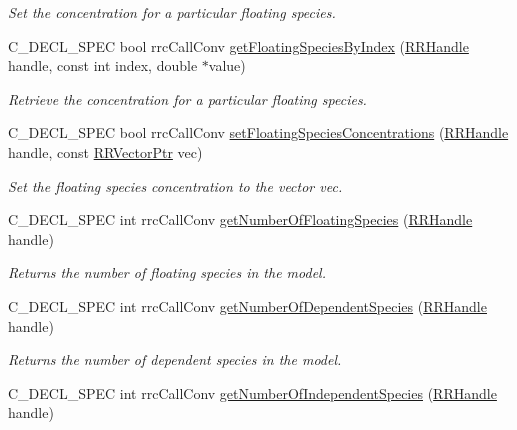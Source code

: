 \begin{DoxyCompactItemize}
\begin{DoxyCompactList}\small\item\em Set the concentration for a particular floating species. \end{DoxyCompactList}\item 
C\-\_\-\-D\-E\-C\-L\-\_\-\-S\-P\-E\-C bool rrc\-Call\-Conv \hyperlink{group__floating_gaa5ab4c688801aa88c60bea9c745a8d7d}{get\-Floating\-Species\-By\-Index} (\hyperlink{rrc__types_8h_a1d68f0592372208fa5a5f2799ea4b3ae}{R\-R\-Handle} handle, const int index, double $\ast$value)
\begin{DoxyCompactList}\small\item\em Retrieve the concentration for a particular floating species. \end{DoxyCompactList}\item 
C\-\_\-\-D\-E\-C\-L\-\_\-\-S\-P\-E\-C bool rrc\-Call\-Conv \hyperlink{group__floating_gab6bde54c81fa570ab09da91b65e92327}{set\-Floating\-Species\-Concentrations} (\hyperlink{rrc__types_8h_a1d68f0592372208fa5a5f2799ea4b3ae}{R\-R\-Handle} handle, const \hyperlink{rrc__types_8h_a3be72d6006034fd349f753d2bf441bf7}{R\-R\-Vector\-Ptr} vec)
\begin{DoxyCompactList}\small\item\em Set the floating species concentration to the vector vec. \end{DoxyCompactList}\item 
C\-\_\-\-D\-E\-C\-L\-\_\-\-S\-P\-E\-C int rrc\-Call\-Conv \hyperlink{group__floating_gab520e3bf495d490a96c5ee19870e7691}{get\-Number\-Of\-Floating\-Species} (\hyperlink{rrc__types_8h_a1d68f0592372208fa5a5f2799ea4b3ae}{R\-R\-Handle} handle)
\begin{DoxyCompactList}\small\item\em Returns the number of floating species in the model. \end{DoxyCompactList}\item 
C\-\_\-\-D\-E\-C\-L\-\_\-\-S\-P\-E\-C int rrc\-Call\-Conv \hyperlink{group__floating_ga284f3c15160144a2639f1d3379f7766b}{get\-Number\-Of\-Dependent\-Species} (\hyperlink{rrc__types_8h_a1d68f0592372208fa5a5f2799ea4b3ae}{R\-R\-Handle} handle)
\begin{DoxyCompactList}\small\item\em Returns the number of dependent species in the model. \end{DoxyCompactList}\item 
C\-\_\-\-D\-E\-C\-L\-\_\-\-S\-P\-E\-C int rrc\-Call\-Conv \hyperlink{group__floating_gaf41fdcb9fb98b278742bb5269a317741}{get\-Number\-Of\-Independent\-Species} (\hyperlink{rrc__types_8h_a1d68f0592372208fa5a5f2799ea4b3ae}{R\-R\-Handle} handle)

\end{DoxyCompactItemize}
